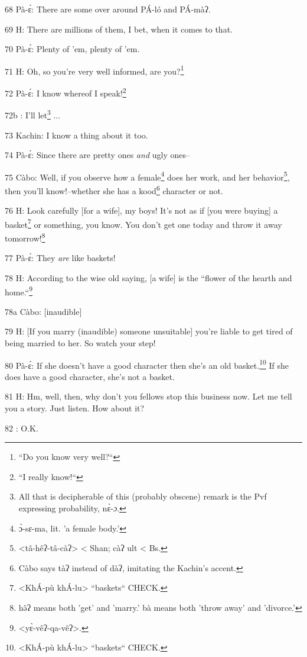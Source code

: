 68 Pà-ɛ́: There are some over around PÁ-ló and PÁ-màʔ.

69 H: There are millions of them, I bet, when it comes to that.

70 Pà-ɛ́: Plenty of 'em, plenty of 'em.

71 H: Oh, so you're very well informed, are you?\footnote{``Do you know very well?``}

72 Pà-ɛ́: I know whereof I speak!\footnote{``I really know!``}

72b       : I'll let\footnote{All that is decipherable of this (probably obscene) remark is the Pvf expressing probability, nɛ̀-\emph{ɔ}.} ...

73 Kachin: I know a thing about it too.

74 Pà-ɛ́: Since there are pretty ones \textit{and} ugly ones--

75 Càbo: Well, if you observe how a female\footnote{ɔ̀-s\emph{ɛ}-ma, lit. 'a female body.'} does her work, and her behavior\footnote{<tâ-hêʔ-tâ-càʔ> < Shan; càʔ ult < Bs.},
then you'll know!--whether she has a kood\footnote{Càbo says tàʔ instead of dàʔ, imitating the Kachin's accent.} character or not.

76 H: Look carefully [for a wife], my boys! It's not as if [you were buying] a
basket\footnote{<KhÁ-pù khÁ-lu> ``baskets`` CHECK.} or something, you know. You don't get one today and throw it away tomorrow!\footnote{hə̂ʔ means both 'get' and 'marry.' bà means both 'throw away' and 'divorce.'}

77 Pà-ɛ́: They \textit{are} like baskets!

78 H: According to the wise old saying, [a wife] is the ``flower of the
hearth and home.``\footnote{<yɛ̀-vêʔ-qa-vêʔ>.}

78a Càbo: [inaudible]

79 H: [If you marry (inaudible) someone unsuitable] you're liable to get tired
of being married to her. So watch your step!

80 Pà-ɛ́: If she doesn't have a good character then she's an old basket.\footnote{<KhÁ-pù khÁ-lu> ``baskets`` CHECK.}
If she does have a good character, she's not a basket.

81 H: Hm, well, then, why don't you fellows stop this business now. Let me tell
you a story. Just listen. How about it?

82    : O.K.

